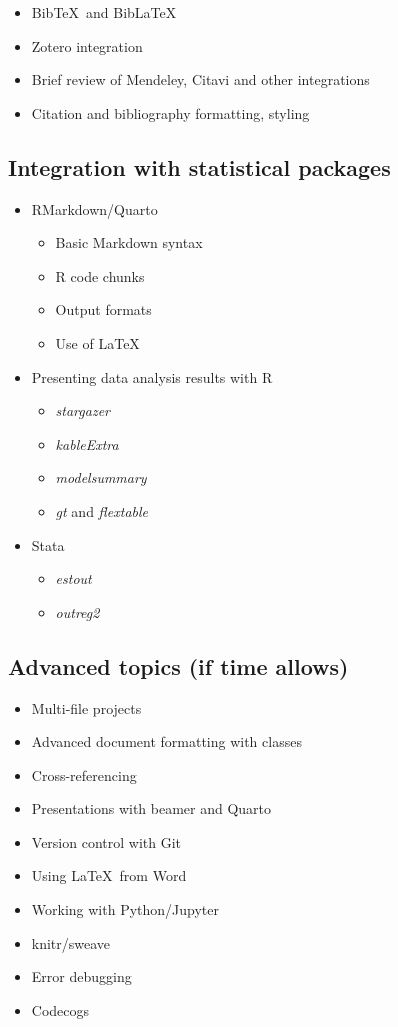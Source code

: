 \documentclass[a4paper,12pt]{article}
\begin{document}
\begin{itemize}
    \item Bib\TeX \ and Bib\LaTeX
    \item Zotero integration
    \item Brief review of Mendeley, Citavi and other integrations
    \item Citation and bibliography formatting, styling
\end{itemize}

\subsection{Integration with statistical packages}

\begin{itemize}
    \item RMarkdown/Quarto
    \begin{itemize}
        \item Basic Markdown syntax
        \item R code chunks
        \item Output formats
        \item Use of \LaTeX
    \end{itemize}
    \item Presenting data analysis results with R
    \begin{itemize}
        \item \textit{stargazer}
        \item \textit{kableExtra}
        \item \textit{modelsummary}
        \item \textit{gt} and \textit{flextable}
    \end{itemize}
    \item Stata
    \begin{itemize}
        \item \textit{estout}
        \item \textit{outreg2}
    \end{itemize}
\end{itemize}

\subsection{Advanced topics (if time allows)}

\begin{itemize}
    \item Multi-file projects
    \item Advanced document formatting with classes
    \item Cross-referencing
    \item Presentations with beamer and Quarto
    \item Version control with Git
    \item Using \LaTeX \ from Word
    \item Working with Python/Jupyter
    \item knitr/sweave
    \item Error debugging
    \item Codecogs
\end{itemize}

\renewcommand\bibname{Reference Material}
\printbibliography
\end{document}
